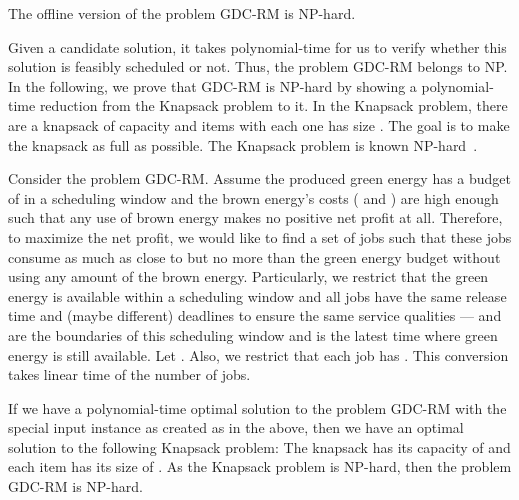 \documentclass[conference]{IEEEtran}
\begin{document}
\begin{theorem}
The offline version of the problem GDC-RM is NP-hard.
\label{thm:nphard}
\end{theorem}

\begin{IEEEproof}
Given a candidate solution, it takes polynomial-time for us to verify whether this solution is feasibly scheduled or not. Thus, the problem GDC-RM belongs to NP. In the following, we prove that GDC-RM is NP-hard by showing a polynomial-time reduction from the Knapsack problem to it. In the Knapsack problem, there are a knapsack of capacity  and  items with each one has size . The goal is to make the knapsack as full as possible. The Knapsack problem is known NP-hard~\cite{GareyJ79}.

Consider the problem GDC-RM. Assume the produced green energy has a budget of  in a scheduling window and the brown energy's costs ( and ) are high enough such that any use of brown energy makes no positive net profit at all. Therefore, to maximize the net profit, we would like to find a set of jobs such that these jobs consume as much as close to but no more than the green energy budget  without using any amount of the brown energy. Particularly, we restrict that the green energy is available within a scheduling window  and all jobs  have the same release time  and (maybe different) deadlines   to ensure the same service qualities  ---  and  are the boundaries of this scheduling window and  is the latest time where green energy is still available. Let . Also, we restrict that each job  has . This conversion takes linear time of the number of jobs.

If we have a polynomial-time optimal solution to the problem GDC-RM with the special input instance as created as in the above, then we have an optimal solution to the following Knapsack problem: The knapsack has its capacity of  and each item  has its size of . As the Knapsack problem is NP-hard, then the problem GDC-RM is NP-hard.
\end{IEEEproof}
\end{document}
